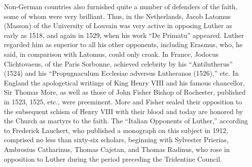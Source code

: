 Non-German countries also furnished quite a number of defenders
of the faith, some of whom were very brilliant. Thus, in the Netherlands,
Jacob Latomus (Masson) of the University of Louvain was
very active in opposing Luther as early as 1518, and again in 1529,
when his work “De Primatu” appeared. Luther regarded him as
superior to all his other opponents, including Erasmus, who, he
said, in comparison with Latomus, could only croak. In France, Jodocus
Clichtovaeus, of the Paris Sorbonne, achieved celebrity by his
“Antilutherus” (1524) and his “Propugnaculum Ecclesiae adversus
Lutheranos (1526),” etc. In England the apologetical writings of
King Henry VIII and his famous chancellor, Sir Thomas More, as well
as those of John Fisher Bishop of Rochester, published in 1523, 1525,
etc., were preeminent. More and Fisher sealed their opposition to the
subsequent schism of Henry VIII with their blood and today are
honored by the Church as martyrs to the faith. The “Italian Opponents of
Luther,” according to Frederick Lauchert, who published a
monograph on this subject in 1912, comprised no less than sixty-six
scholars, beginning with Sylvester Prierias, Ambrosius Catharinus,
Thomas Cajetan, and Thomas Radinus, who rose in opposition to
Luther during the period preceding the Tridentine Council.
